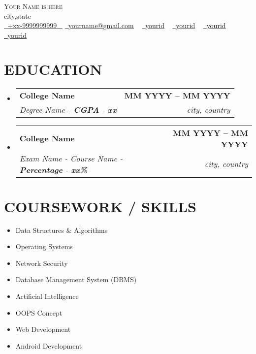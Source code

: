 \documentclass[letterpaper,11pt]{article}
\makeatletter
\newcommand{\resumeSubheading}[4]{
  \vspace{-2pt}\item
    \begin{tabular*}{1.0\textwidth}[t]{l@{\extracolsep{\fill}}r}
      \textbf{\large#1} & \textbf{\small #2} \\
      \textit{\large#3} & \textit{\small #4} \\
     
    \end{tabular*}\vspace{-7pt}
}
\newcommand{\resumeSubHeadingListStart}{\begin{itemize}[leftmargin=0.0in, label={}]}
\newcommand{\resumeSubHeadingListEnd}{\end{itemize}}
\makeatother
\begin{document}




\begin{center}
    {\Huge \scshape Your Name is here} \\ \vspace{1pt}
    city,state \\ \vspace{1pt}
    \small \href{tel:+xxxxxxxxxxxx}{ \raisebox{-0.1\height}\faPhone\ \underline{+xx-9999999999} ~} \href{mailto:yourname@gmail.com}{\raisebox{-0.2\height}\faEnvelope\  \underline{yourname@gmail.com}} ~
    \href{https://linkedin.com/in/yourid}{\raisebox{-0.2\height}\faLinkedinSquare\ \underline{yourid}}  ~
    \href{https://github.com/yourid}{\raisebox{-0.2\height}\faGithub\ \underline{yourid}} ~
    \href{https://www.hackerrank.com/yourid}{\raisebox{-0.2\height}\faHackerrank\ \underline{yourid}} ~
    \href{https://codeforces.com/profile/yourid}{\raisebox{-0.2\height}\faPoll\ \underline{yourid}}
    \vspace{-8pt}
\end{center}




\section{EDUCATION}
  \resumeSubHeadingListStart
    \resumeSubheading
      {College Name}{MM YYYY -- MM YYYY}
      {Degree Name - \textbf{CGPA} - \textbf{xx}}{city, country}
  \resumeSubHeadingListEnd
 
  \resumeSubHeadingListStart
    \resumeSubheading
      {College Name}{MM YYYY -- MM YYYY}
      {Exam Name - Course Name  - \textbf{Percentage} - \textbf{xx\%}}{city, country}
  \resumeSubHeadingListEnd


\section{COURSEWORK / SKILLS}
        \begin{multicols}{4}
            \begin{itemize}[itemsep=-2pt, parsep=5pt]
                \item Data Structures \& Algorithms
                \item Operating Systems
                \item Network Security
                \item Database Management System (DBMS)
               \item Artificial Intelligence
                \item OOPS Concept
                \item Web Development
                \item Android Development
            \end{itemize}
        \end{multicols}
        \vspace*{2.0\multicolsep}
\end{document}
